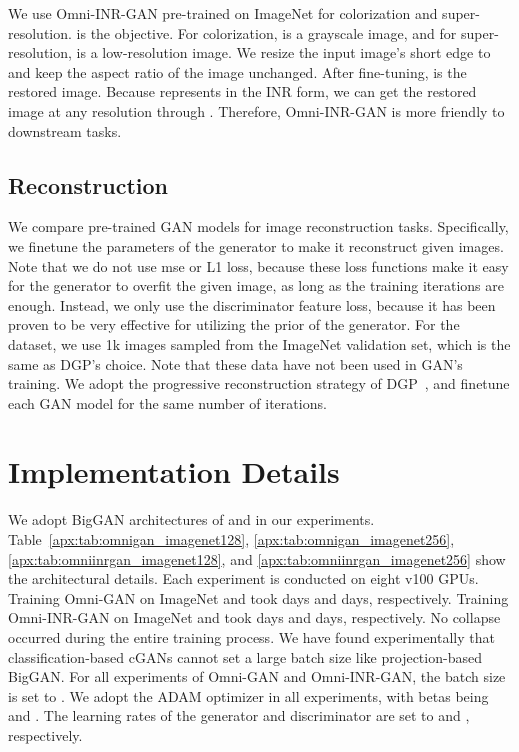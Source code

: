\documentclass[paper_2425.tex]{subfiles}
\begin{document}
We use Omni-INR-GAN pre-trained on ImageNet  for colorization and super-resolution.  is the objective. For colorization,  is a grayscale image, and for super-resolution,  is a low-resolution image. We resize the input image's short edge to  and keep the aspect ratio of the image unchanged.  After fine-tuning,  is the restored image. Because  represents  in the INR form, we can get the restored image at any resolution through . Therefore, Omni-INR-GAN is more friendly to downstream tasks.



\subsection{Reconstruction}

We compare pre-trained GAN models for image reconstruction tasks. Specifically, we finetune the parameters of the generator to make it reconstruct given images. Note that we do not use mse or L1 loss, because these loss functions make it easy for the generator to overfit the given image, as long as the training iterations are enough. Instead, we only use the discriminator feature loss, because it has been proven to be very effective for utilizing the prior of the generator. For the dataset, we use 1k images sampled from the ImageNet validation set, which is the same as DGP's choice. Note that these data have not been used in GAN's training. We adopt the progressive reconstruction strategy of DGP~\cite{pan2020Exploiting}, and finetune each GAN model for the same number of iterations.


\section{Implementation Details}

We adopt BigGAN architectures of  and  in our experiments. Table~\ref{apx:tab:omnigan_imagenet128}, \ref{apx:tab:omnigan_imagenet256}, \ref{apx:tab:omniinrgan_imagenet128}, and \ref{apx:tab:omniinrgan_imagenet256} show the architectural details. Each experiment is conducted on eight v100 GPUs. Training Omni-GAN on ImageNet  and  took  days and  days, respectively. Training Omni-INR-GAN on ImageNet  and  took  days and  days, respectively. No collapse occurred during the entire training process. We have found experimentally that classification-based cGANs cannot set a large batch size like projection-based BigGAN. For all experiments of Omni-GAN and Omni-INR-GAN, the batch size is set to . We adopt the ADAM optimizer in all experiments, with betas being  and . The learning rates of the generator and discriminator are set to  and , respectively.
\end{document}
